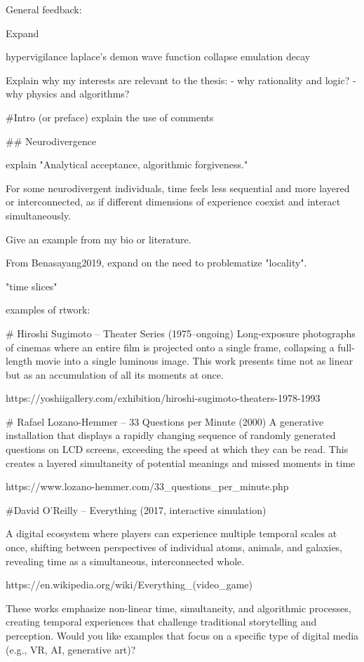 

General feedback: 

Expand 

hypervigilance
laplace's demon
wave function collapse
emulation
decay

Explain why my interests are relevant to the thesis:  
 - why rationality and logic?
 - why physics and algorithms? 

 
 #Intro (or preface)
 explain the use of comments 


 

## Neurodivergence

explain  "Analytical acceptance, algorithmic forgiveness." 


For some neurodivergent individuals, time feels less
sequential and more layered or interconnected, as if different
dimensions of experience coexist and interact simultaneously.

Give an example from my bio or literature. 

From Benasayang2019, expand on the need to problematize "locality". 


"time slices"

examples of rtwork: 

# Hiroshi Sugimoto – Theater Series (1975–ongoing)
Long-exposure photographs of cinemas where an entire film is projected onto a single frame, collapsing a full-length movie into a single luminous image. This work presents time not as linear but as an accumulation of all its moments at once.

https://yoshiigallery.com/exhibition/hiroshi-sugimoto-theaters-1978-1993


# Rafael Lozano-Hemmer – 33 Questions per Minute (2000)
A generative installation that displays a rapidly changing sequence of randomly generated questions on LCD screens, exceeding the speed at which they can be read. This creates a layered simultaneity of potential meanings and missed moments in time

https://www.lozano-hemmer.com/33_questions_per_minute.php



#David O’Reilly – Everything (2017, interactive simulation)

A digital ecosystem where players can experience multiple temporal scales at once, shifting between perspectives of individual atoms, animals, and galaxies, revealing time as a simultaneous, interconnected whole.

https://en.wikipedia.org/wiki/Everything_(video_game)

These works emphasize non-linear time, simultaneity, and algorithmic processes, creating temporal experiences that challenge traditional storytelling and perception. Would you like examples that focus on a specific type of digital media (e.g., VR, AI, generative art)?


